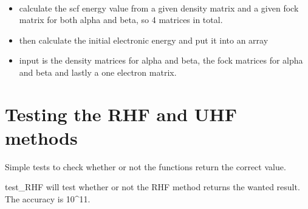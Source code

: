 \documentclass[letterpaper,10pt,english]{sphinxmanual}
\begin{document}

\begin{fulllineitems}
\label{\detokenize{SCF_functions:ghf.SCF_functions.uhf_scf_energy}}~\begin{itemize}
\item {} 
calculate the scf energy value from a given density matrix and a given fock matrix for both alpha and beta,
so 4 matrices in total.

\item {} 
then calculate the initial electronic energy and put it into an array

\item {} 
input is the density matrices for alpha and beta, the fock matrices for alpha and beta and lastly a one electron
matrix.

\end{itemize}

\end{fulllineitems}

\label{\detokenize{tests:module-ghf.tests.test_auth}}

\chapter{Testing the RHF and UHF methods}
\label{\detokenize{tests:testing-the-rhf-and-uhf-methods}}\label{\detokenize{tests::doc}}
Simple tests to check whether or not the functions return the correct value.

\begin{fulllineitems}
\label{\detokenize{tests:ghf.tests.test_auth.test_RHF}}
test\_RHF will test whether or not the RHF method returns the wanted result. The accuracy is 10\textasciicircum{}11.

\end{fulllineitems}
\end{document}
